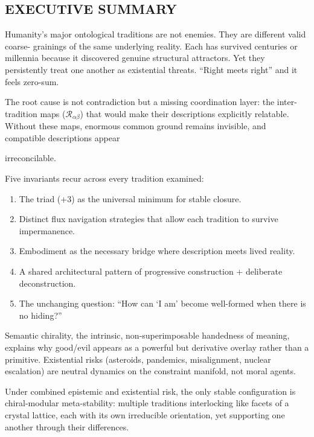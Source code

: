 \documentclass[
]{article}
\providecommand{\tightlist}{%
  \setlength{\itemsep}{0pt}\setlength{\parskip}{0pt}}
\begin{document}
\subsection{EXECUTIVE SUMMARY}\label{executive-summary-2}

Humanity's major ontological traditions are not enemies. They are
different valid coarse- grainings of the same underlying reality. Each
has survived centuries or millennia because it discovered genuine
structural attractors. Yet they persistently treat one another as
existential threats. ``Right meets right'' and it feels zero-sum.

The root cause is not contradiction but a missing coordination layer:
the inter-tradition maps (\(\mathcal{R}_{\alpha\beta}\)) that would make
their descriptions explicitly relatable. Without these maps, enormous
common ground remains invisible, and compatible descriptions appear

irreconcilable.

Five invariants recur across every tradition examined:

\begin{enumerate}
\def\labelenumi{\arabic{enumi}.}
\tightlist
\item
  The triad (+3) as the universal minimum for stable closure.
\item
  Distinct flux navigation strategies that allow each tradition to
  survive impermanence.
\item
  Embodiment as the necessary bridge where description meets lived
  reality.
\item
  A shared architectural pattern of progressive construction +
  deliberate deconstruction.
\item
  The unchanging question: ``How can `I am' become well-formed when
  there is no hiding?''
\end{enumerate}

Semantic chirality, the intrinsic, non-superimposable handedness of
meaning, explains why good/evil appears as a powerful but derivative
overlay rather than a primitive. Existential risks (asteroids,
pandemics, misalignment, nuclear escalation) are neutral dynamics on the
constraint manifold, not moral agents.

Under combined epistemic and existential risk, the only stable
configuration is chiral-modular meta-stability: multiple traditions
interlocking like facets of a crystal lattice, each with its own
irreducible orientation, yet supporting one another through their
differences.
\end{document}
